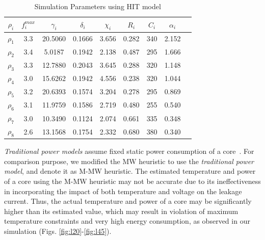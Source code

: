 \documentclass[conference]{IEEEtran}
\begin{document}
\vspace{-0.1in}
\begin{table}[!h!tbs]
\caption{Simulation Parameters using HIT model}
\vspace{-0.1in}
\begin{center}
        \begin{tabular}{|c|c|c|c|c|c|c|c|c|}
        \hline
        $\rho_i$ & $f^{max}_i$ & $\gamma_i$ & $\delta_i$ & $\chi_i$ & $R_i$ & $C_i$ & $\alpha_i$  \\[0.5ex]
        \hline
        \hline $\rho_1$ & 3.3 & 20.5060 & 0.1666 & 3.656 & 0.282 & 340 & 2.152 \\
        \hline $\rho_2$ & 3.4 & 5.0187 & 0.1942 & 2.138 & 0.487 & 295 & 1.666 \\
        \hline $\rho_3$ & 3.3 & 12.7880 & 0.2043 & 3.645 & 0.288 & 320 & 1.148 \\
        \hline $\rho_4$ & 3.0 & 15.6262 & 0.1942 & 4.556 & 0.238 & 320 & 1.044 \\
        \hline $\rho_5$ & 3.2 & 20.6393 & 0.1574 & 3.204 & 0.278 & 295 & 0.869 \\
        \hline $\rho_6$ & 3.1 & 11.9759 & 0.1586 & 2.719 & 0.480 & 255 & 0.540 \\
        \hline $\rho_7$ & 3.0 & 10.3490 & 0.1124 & 2.074 & 0.661 & 335 & 0.348 \\
        \hline $\rho_8$ & 2.6 & 13.1568 & 0.1754 & 2.332 & 0.680 & 380 & 0.340 \\
        \hline
        \end{tabular}
\vspace{-0.1in}
\label{tab:simple}
\end{center}
\end{table}
\vspace{-0.1in}



\emph{Traditional power models} assume fixed static power
consumption of a core~\cite{Chen09}.
For comparison purpose, we modified the MW heuristic to use the \emph{traditional power model}, and denote it as M-MW heuristic.
The estimated temperature and power of a core using the M-MW heuristic may not be accurate due to its ineffectiveness in incorporating the impact of both temperature and voltage on the leakage current.
Thus, the actual temperature and power of a core may be significantly higher than its estimated value, which may result in violation of maximum temperature constraints and very high energy consumption, as observed in our simulation (Figs. \ref{fig:l20}-\ref{fig:l45}).
\end{document}
